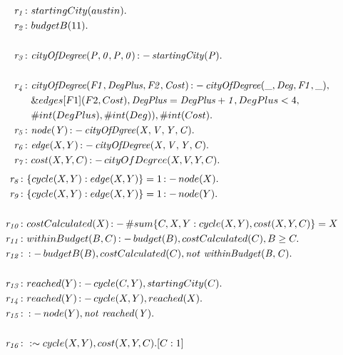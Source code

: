 \documentclass[a4paper, titlepage]{article}
\newcommand{\ext}[3]{\ensuremath{\&{#1}[#2](#3)}}
\DeclareMathOperator{\leftimpl}{:-}
\newcommand{\row}[1]{%
  \ensuremath{\it \color{black} #1 \color{black}}%
}
\begin{document}
\begin{exmp}
\label{travellingsalesperson}
\begin{align*}
\row{r_1}\colon & startingCity(austin).\\
\row{r_2}\colon & budgetB(11).\\
\\
\row{r_3}\colon & \mathit{cityOfDegree(P,0,P,0)} \leftimpl 
\mathit{startingCity(P).} \\
& \\
\row{r_4}\colon & \mathit{cityOfDegree(F1, DegPlus, F2, Cost)} 
\leftimpl \mathit{cityOfDegree(\_, Deg, F1, \_)}, \\ 
&\ext{edges}{F1}{F2, Cost}, \mathit{DegPlus=DegPlus+1}, 
DegPlus < 4, \\ & \#int(DegPlus), \#int(Deg)), \#int(Cost). 
\\
\row{r_5}\colon& \mathit{node(Y)} \leftimpl 
\mathit{cityOfDgree(X, V, Y, C)}.\\
\row{r_6}\colon& \mathit{edge}(X, Y) \leftimpl 
\mathit{cityOfDegree(X, V, Y, C).} \\
\row{r_7}\colon & cost(X,Y,C) \leftimpl cityOfDegree(X, V, Y, C). 
\end{align*}
\begin{align*}
\row{r_8} \colon & \{ cycle(X,Y) : edge(X,Y) \} = 1 \leftimpl 
node(X). \\
\row{r_9} \colon &  \{ cycle(X,Y) : edge(X,Y) \} = 1 \leftimpl 
node(Y). \\
& \\
\row{r_{10}} \colon & costCalculated(X) \leftimpl \#sum \{C,X,Y : 
cycle(X,Y), cost(X,Y,C)\} = X \\
\row{r_{11}} \colon & withinBudget(B,C) \leftimpl budget(B), 
costCalculated(C), B \geq C. \\
\row{r_{12}} \colon & \leftimpl  budgetB(B), costCalculated(C), 
\mathit{not} \ \mathit{withinBudget(B,C).} \\
& \\
\row{\row{r_{13}}} \colon & reached(Y) \leftimpl cycle(C, Y), startingCity(C). \\
\row{r_{14}} \colon & reached(Y) \leftimpl cycle(X,Y), 
reached(X). \\
\row{r_{15}} \colon & \leftimpl node(Y), \mathit{not} \ 
\mathit{reached(Y)}. \\
& \\
\row{r_{16}} \colon & :\sim cycle(X,Y), cost(X,Y,C). [C:1] 
\end{align*}
\end{exmp}
\end{document}
